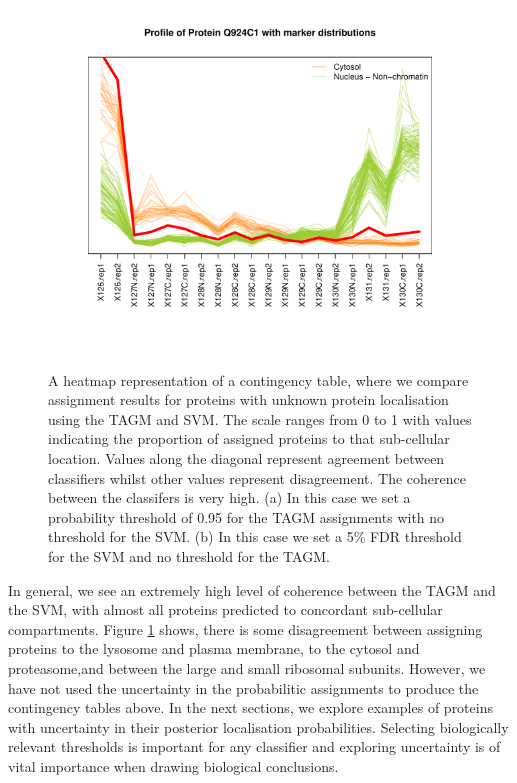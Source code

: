 \documentclass[12pt,english]{article}\usepackage[]{graphicx}\usepackage[]{color}
\makeatletter
\def\maxwidth{ %
  \ifdim\Gin@nat@width>\linewidth
    \linewidth
  \else
    \Gin@nat@width
  \fi
}
\newenvironment{knitrout}{}{} %
\makeatother
\begin{document}
\begin{figure}[ht]
\begin{subfigure}[t]{0.5\textwidth}
\begin{knitrout}
{\centering \includegraphics[width=\maxwidth]{figure/unnamed-chunk-13-1} 

}



\end{knitrout}
        \caption{}
\end{subfigure}
  \caption{A heatmap representation of a contingency table,
    where we compare assignment results for proteins
    with unknown protein localisation using the TAGM and
    SVM. The scale ranges from 0 to 1 with values indicating
    the proportion of assigned proteins to that
    sub-cellular location. Values along the diagonal
    represent agreement between classifiers whilst other values
    represent disagreement. The coherence between the classifers is
    very high.
    (a)  In this case we set a probability threshold of 0.95
    for the TAGM assignments with no threshold for the SVM.
    (b)  In this case we set a 5\% FDR threshold for the SVM and
    no threshold for the TAGM.}
\label{figure:contigencytables}
\end{figure}

In general, we see an extremely high level of coherence between the
TAGM and the SVM, with almost all proteins predicted to
concordant sub-cellular compartments. Figure \ref{figure:contigencytables} shows,
there is some disagreement between assigning proteins to the lysosome and
plasma membrane, to the cytosol and proteasome,and between the large and small ribosomal subunits.
However, we have not used the uncertainty in the probabilitic assignments to produce the
contingency tables above. In the next sections, we explore examples of proteins
with uncertainty in their posterior localisation probabilities. Selecting
biologically relevant thresholds is important for any
classifier and exploring uncertainty is of vital importance
when drawing biological conclusions.
\end{document}
